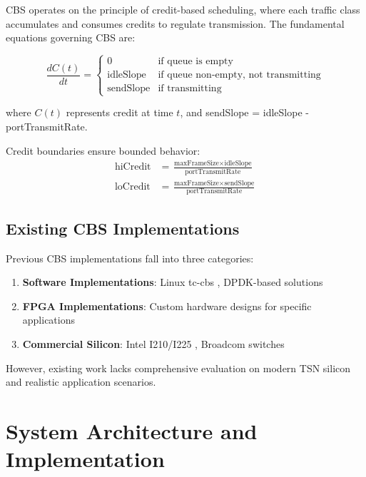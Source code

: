 \documentclass[10pt, journal, compsoc]{IEEEtran}
\begin{document}
CBS operates on the principle of credit-based scheduling, where each traffic class accumulates and consumes credits to regulate transmission. The fundamental equations governing CBS are:

\begin{equation}
\frac{dC(t)}{dt} = \begin{cases}
0 & \text{if queue is empty} \\
\text{idleSlope} & \text{if queue non-empty, not transmitting} \\
\text{sendSlope} & \text{if transmitting}
\end{cases}
\end{equation}

where $C(t)$ represents credit at time $t$, and sendSlope = idleSlope - portTransmitRate.

Credit boundaries ensure bounded behavior:
\begin{align}
\text{hiCredit} &= \frac{\text{maxFrameSize} \times \text{idleSlope}}{\text{portTransmitRate}} \\
\text{loCredit} &= \frac{\text{maxFrameSize} \times \text{sendSlope}}{\text{portTransmitRate}}
\end{align}

\subsection{Existing CBS Implementations}

Previous CBS implementations fall into three categories:

\begin{enumerate}
    \item \textbf{Software Implementations}: Linux tc-cbs \cite{linux2023cbs}, DPDK-based solutions \cite{zhang2022dpdk}
    \item \textbf{FPGA Implementations}: Custom hardware designs for specific applications \cite{kim2021hardware}
    \item \textbf{Commercial Silicon}: Intel I210/I225 \cite{intel2021i210}, Broadcom switches
\end{enumerate}

However, existing work lacks comprehensive evaluation on modern TSN silicon and realistic application scenarios.

\section{System Architecture and Implementation}
\end{document}
